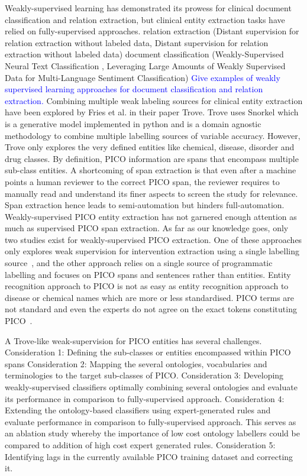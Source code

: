 \documentclass[10.7pt,]{article}
\begin{document}
Weakly-supervised learning has demonstrated its prowess for clinical document classification and relation extraction, but clinical entity extraction tasks have relied on fully-supervised approaches.
relation extraction (Distant supervision for relation extraction without labeled data, Distant supervision for relation extraction without labeled data)
document classification (Weakly-Supervised Neural Text Classification
, Leveraging Large Amounts of Weakly Supervised Data for
Multi-Language Sentiment Classification)
\textcolor{blue}{Give examples of weakly supervised learning approaches for document classification and relation extraction.}
Combining multiple weak labeling sources for clinical entity extraction have been explored by Fries et al. in their paper Trove.
Trove uses Snorkel which is a generative model implemented in python and is a domain agnostic methodology to combine multiple labelling sources of variable accuracy.
However, Trove only explores the very defined entities like chemical, disease, disorder and drug classes. 
By definition, PICO information are spans that encompass multiple sub-class entities.
A shortcoming of span extraction is that even after a machine points a human reviewer to the correct PICO span, the reviewer requires to manually read and understand its finer aspects to screen the study for relevance.
Span extraction hence leads to semi-automation but hinders full-automation.
Weakly-supervised PICO entity extraction has not garnered enough attention as much as supervised PICO span extraction.
As far as our knowledge goes, only two studies exist for weakly-supervised PICO extraction.
One of these approaches only explores weak supervision for intervention extraction using a single labelling source~\cite{dhrangadhariya2022distant}, and the other approach relies on a single source of programmatic labelling and focuses on PICO spans and sentences rather than entities.
Entity recognition approach to PICO is not as easy as entity recognition approach to disease or chemical names which are more or less standardised.
PICO terms are not standard and even the experts do not agree on the exact tokens constituting PICO~\cite{brockmeier2019improving}.

A Trove-like weak-supervision for PICO entities has several challenges.
Consideration 1: Defining the sub-classes or entities encompassed within PICO spans
Consideration 2: Mapping the several ontologies, vocabularies and terminologies to the target sub-classes of PICO.
Consideration 3: Developing weakly-supervised classifiers optimally combining several ontologies and evaluate its performance in comparison to fully-supervised approach.
Consideration 4: Extending the ontology-based classifiers using expert-generated rules and evaluate performance in comparison to fully-supervised approach. This serves as an ablation study whereby the importance of low cost ontology labellers could be compared to addition of high cost expert generated rules.
Consideration 5: Identifying lags in the currently available PICO training dataset and correcting it.
\end{document}
